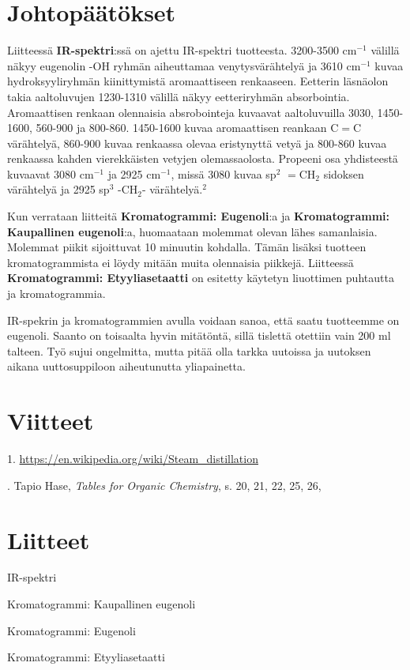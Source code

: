 \documentclass[11pt,a4paper]{article}
\begin{document}
\section{Johtopäätökset}

Liitteessä \textbf{IR-spektri}:ssä on ajettu IR-spektri tuotteesta. 3200-3500 cm$^{-1}$ välillä näkyy eugenolin -OH ryhmän aiheuttamaa venytysvärähtelyä ja 3610 cm$^{-1}$ kuvaa hydroksyyliryhmän kiinittymistä aromaattiseen renkaaseen. Eetterin läsnäolon takia aaltoluvujen 1230-1310 välillä näkyy eetteriryhmän absorbointia. Aromaattisen renkaan olennaisia absrobointeja kuvaavat aaltoluvuilla 3030, 1450-1600, 560-900 ja 800-860. 1450-1600 kuvaa aromaattisen reankaan C$=$C värähtelyä, 860-900 kuvaa renkaassa olevaa eristynyttä vetyä ja 800-860 kuvaa renkaassa kahden vierekkäisten vetyjen olemassaolosta. Propeeni osa yhdisteestä kuvaavat 3080 cm$^{-1}$ ja 2925 cm$^{-1}$, missä 3080 kuvaa sp$^2$ $=$CH$_2$ sidoksen värähtelyä ja 2925 sp$^3$ -CH$_2$- värähtelyä.$^2$

Kun verrataan liitteitä \textbf{Kromatogrammi: Eugenoli}:a ja \textbf{Kromatogrammi: Kaupallinen eugenoli}:a, huomaataan molemmat olevan lähes samanlaisia. Molemmat piikit sijoittuvat 10 minuutin kohdalla. Tämän lisäksi tuotteen kromatogrammista ei löydy mitään muita olennaisia piikkejä. Liitteessä \textbf{Kromatogrammi: Etyyliasetaatti} on esitetty käytetyn liuottimen puhtautta ja kromatogrammia.

IR-spekrin ja kromatogrammien avulla voidaan sanoa, että saatu tuotteemme on eugenoli.  Saanto on toisaalta hyvin mitätöntä, sillä tislettä otettiin vain 200 ml talteen. Työ sujui ongelmitta, mutta pitää olla tarkka uutoissa ja uutoksen aikana uuttosuppiloon aiheutunutta yliapainetta.

\section{Viitteet}

1. \url{https://en.wikipedia.org/wiki/Steam_distillation}

. Tapio Hase, \textit{Tables for Organic Chemistry}, s. 20, 21, 22, 25, 26, 

\section{Liitteet}

IR-spektri

\noindent Kromatogrammi: Kaupallinen eugenoli 

\noindent Kromatogrammi: Eugenoli 

\noindent Kromatogrammi: Etyyliasetaatti
\end{document}
